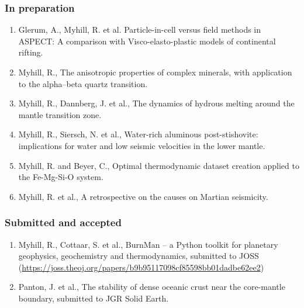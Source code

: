 \documentclass[11pt,twoside,a4paper]{article}
\begin{document}
\subsubsection*{In preparation}
\small \sloppy
\begin{enumerate}
\item Glerum, A., Myhill, R. et al. Particle-in-cell versus field methods in ASPECT: A comparison with Visco-elasto-plastic models of continental rifting.
\item Myhill, R., The anisotropic properties of complex minerals, with application to the alpha--beta quartz transition.
\item Myhill, R., Dannberg, J. et al., The dynamics of hydrous melting around the mantle transition zone.
\item Myhill, R., Siersch, N. et al., Water-rich aluminous post-stishovite: implications for water and low seismic velocities in the lower mantle.
\item Myhill, R. and Beyer, C., Optimal thermodynamic dataset creation applied to the Fe-Mg-Si-O system.
\item Myhill, R. et al., A retrospective on the causes on Martian seismicity.
\end{enumerate}

\subsubsection*{Submitted and accepted}
\begin{enumerate}
  \item Myhill, R., Cottaar, S. et al., BurnMan -- a Python toolkit for planetary geophysics, geochemistry and thermodynamics, submitted to JOSS (\url{https://joss.theoj.org/papers/b9b95117098cf85598bb01dadbe62ee2})
  \item Panton, J. et al., The stability of dense oceanic crust near the core-mantle boundary, submitted to JGR Solid Earth.
\end{enumerate}
\end{document}
